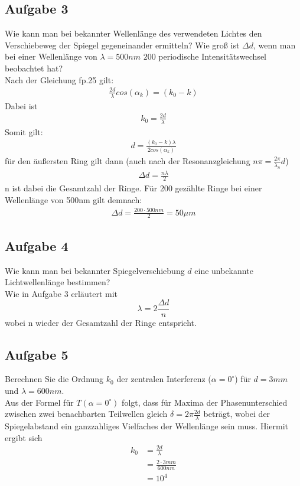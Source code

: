 \documentclass[a4paper,10pt]{scrartcl}
\begin{document}
	\subsection{Aufgabe 3} 
	Wie kann man bei bekannter Wellenlänge des verwendeten Lichtes den Verschiebeweg der Spiegel gegeneinander ermitteln? Wie groß ist $\Delta d$, wenn man bei einer Wellenlänge von $\lambda = 500nm$ $200$ periodische Intensitätswechsel beobachtet hat?\\
	Nach der Gleichung fp.25 gilt:
	\begin{align*}
	\frac{2d}{\lambda}cos(\alpha_{k})=(k_{0}-k)
	\end{align*}
	Dabei ist
	\begin{align*}
	k_{0}=\frac{2d}{\lambda}
	\end{align*}
	Somit gilt:
	\begin{align*}
	d=\frac{(k_{0}-k)\lambda}{2cos(\alpha_{k})}
	\end{align*}
	für den äußersten Ring gilt dann (auch nach der Resonanzgleichung \(n\pi=\frac{2\pi}{\lambda_{n}}d\))
	\begin{align*}
	\Delta d=\frac{n\lambda}{2}
	\end{align*}
	n ist dabei die Gesamtzahl der Ringe. Für 200 gezählte Ringe bei einer Wellenlänge von 500nm gilt demnach:
	\begin{align*}
	\Delta d=\frac{200\cdot 500nm}{2}=50\mu m
	\end{align*}
	\subsection{Aufgabe 4}
	 Wie kann man bei bekannter Spiegelverschiebung $d$ eine unbekannte Lichtwellenlänge bestimmen?\\
	Wie in Aufgabe 3 erläutert mit
	\[
	{\lambda}=2\frac{\Delta d}{n}
	\]
	wobei n wieder der Gesamtzahl der Ringe entspricht. \\
	\subsection{Aufgabe 5} 
	Berechnen Sie die Ordnung $k_0$ der zentralen Interferenz ($\alpha=0^\circ$) für $d=3mm$ und $\lambda =600nm$.
	\\Aus der Formel für $T(\alpha=0^\circ)$ folgt, dass für Maxima der Phasenunterschied zwischen zwei benachbarten Teilwellen gleich $\delta=2\pi \frac{2d}{\lambda}$ beträgt, wobei der Spiegelabstand ein ganzzahliges Vielfaches der Wellenlänge sein muss. Hiermit ergibt sich
	\begin{align*}
	k_0 &= \frac{2d}{\lambda}
	\\ &= \frac{2\cdot 3mm}{600nm}
	\\ &= 10^4
	\end{align*}\\
\end{document}
